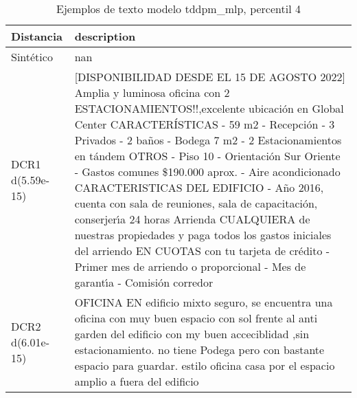 \begin{table}[H]
\centering
\fontsize{10}{14}\selectfont
\caption{Ejemplos de texto modelo tddpm\_mlp, percentil 4}
\label{table-example-economicos-b-3-tddpm_mlp-4p-text}
\begin{tabular}{|l|m{35em}|}
\hline
\rowcolor[gray]{0.8}
Distancia & description \\
\hline Sintético & nan \\
\hline DCR1 d(5.59e-15) & [DISPONIBILIDAD DESDE EL 15 DE AGOSTO 2022]  Amplia y luminosa oficina con 2 ESTACIONAMIENTOS!!,excelente ubicaci\'on en Global Center  CARACTER\'ISTICAS - 59 m2 - Recepci\'on  - 3 Privados - 2 ba\~nos - Bodega 7 m2 - 2 Estacionamientos en t\'andem  OTROS - Piso 10 - Orientaci\'on Sur Oriente - Gastos comunes \$190.000 aprox. - Aire acondicionado  CARACTERISTICAS DEL EDIFICIO - A\~no 2016, cuenta con sala de reuniones, sala de capacitaci\'on, conserjer{\'\i}a 24 horas  Arrienda CUALQUIERA de nuestras propiedades y paga todos los gastos iniciales del arriendo EN CUOTAS con tu tarjeta de cr\'edito - Primer mes de arriendo o proporcional - Mes de garant{\'\i}a - Comisi\'on corredor \\
\hline DCR2 d(6.01e-15) & OFICINA EN edificio mixto seguro, se encuentra una oficina con muy buen espacio con sol frente al anti garden del edificio con my buen acceciblidad  ,sin estacionamiento.  no tiene Podega pero con bastante espacio para guardar. estilo oficina casa por el espacio amplio a fuera del edificio \\
\hline
\end{tabular}
\end{table}
